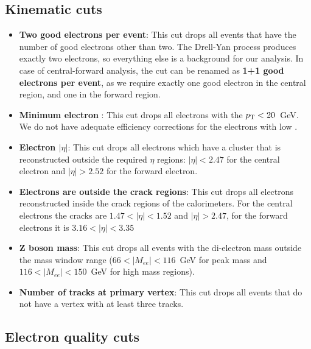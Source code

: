 \subsection{Kinematic cuts}
\label{sec:Sel_kinematic}

\begin{itemize}
\item {\bfseries Two good electrons per event}: This cut drops all events that have the number of good electrons other than two. The Drell-Yan process produces exactly two electrons, so everything else is a background for our analysis. In case of central-forward analysis, the cut can be renamed as {\bfseries 1+1 good electrons per event}, as we require exactly one good electron in the central region, and one in the forward region.
\item {\bfseries Minimum electron \pt}: This cut drops all electrons with the $p_{\mathrm{T}} < 20$~GeV. We do not have adequate efficiency corrections for the electrons with low \pt.
\item {\bfseries Electron $|\eta|$}: This cut drops all electrons which have a cluster that is reconstructed outside the required $\eta$ regions: $|\eta| < 2.47$ for the central electron and $|\eta| > 2.52$ for the forward electron.
\item {\bfseries Electrons are outside the crack regions}: This cut drops all electrons reconstructed inside the crack regions of the calorimeters. For the central electrons the cracks are $1.47 < |\eta| < 1.52$ and $|\eta| > 2.47$, for the forward electrons it is $3.16 < |\eta| < 3.35$
\item {\bfseries Z boson mass}: This cut drops all events with the di-electron mass outside the mass window range ($66 < |M_{ee}| < 116$~GeV for peak mass and $116 < |M_{ee}| < 150$~GeV for high mass regions).
\item {\bfseries Number of tracks at primary vertex}: This cut drops all events that do not have a vertex with at least three tracks.
\end{itemize}

\subsection{Electron quality cuts}
\label{sec:Sel_isem_iso}


